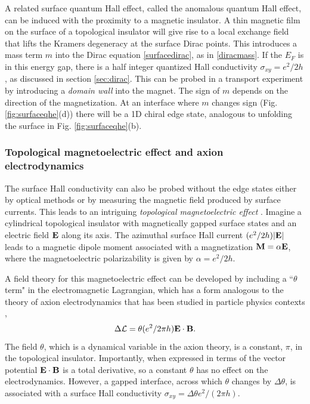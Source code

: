 \documentclass[twocolumn,floatfix,showpacs,rmp,aps]{revtex4}
\begin{document}
	A related surface quantum Hall effect, called the anomalous quantum Hall
	effect, can be induced with the proximity to a
	magnetic insulator.  A thin magnetic
	film on the surface of a topological insulator will give rise to a local exchange
	field that lifts the Kramers degeneracy at the surface Dirac points.  This
	introduces a mass term $m$ into the Dirac equation \eqref{surfacedirac},
	as in \eqref{diracmass}.  If the $E_F$ is in this energy
	gap, there is a half integer quantized Hall conductivity
	$\sigma_{xy}=e^2/2h$\cite{pankratov87}, as discussed in section \ref{sec:dirac}.
	This can be probed in a transport experiment by introducing a {\it domain
		wall} into the magnet.  The sign of $m$ depends on the direction of
	the magnetization.  At an interface where $m$ changes sign (Fig. \ref{fig:surfaceqhe}(d))
	there will be a 1D chiral edge state, analogous to unfolding the
	surface in Fig. \ref{fig:surfaceqhe}(b).
	
	\subsubsection{Topological magnetoelectric effect and axion electrodynamics}
	\label{sec:topomag}
	
	The surface Hall conductivity can also be probed without the
	edge states either by optical methods or by measuring the magnetic field produced by surface
	currents.  This leads to an intriguing {\it topological magnetoelectric effect} \cite{qihugheszhang08,essin09}.
	Imagine a cylindrical topological insulator with magnetically gapped surface
	states and an electric field ${\bf E}$ along its axis.  The azimuthal surface Hall
	current $(e^2/2h)|{\bf E}|$ leads to a magnetic dipole moment associated
	with a magnetization ${\bf M} = \alpha{\bf E}$, where the magnetoelectric polarizability
	is given by $\alpha = e^2/2h$.
	
	A field theory for this magnetoelectric effect can be developed by including a
	``$\theta$ term" in the electromagnetic Lagrangian, which has a form analogous to
	the theory of axion electrodynamics that has been studied in particle
	physics contexts \cite{wilczek87},
	\begin{equation}
		\Delta {\cal L} = \theta (e^2/2\pi h) {\bf E}\cdot{\bf B}.
		\label{edotb}
	\end{equation}
	The field $\theta$, which is a dynamical variable in the axion theory, is
	a constant, $\pi$, in the topological insulator.
	Importantly, when expressed in terms of the vector potential ${\bf E}\cdot {\bf
		B}$ is a total derivative, so a constant $\theta$ has no effect on the
	electrodynamics.  However, a gapped interface,
	across which $\theta$ changes by $\Delta\theta$, is
	associated with a surface Hall conductivity $\sigma_{xy} = \Delta\theta e^2/(2\pi h)$.
	
\end{document}
